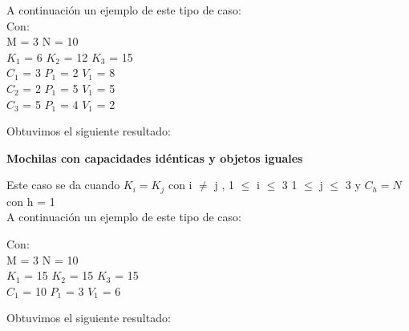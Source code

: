 A continuaci\'on un ejemplo de este tipo de caso:\\

 Con:\\
 M = 3 N = 10\\
 $K_{1}$ = 6  $K_{2}$ = 12  $K_{3}$ = 15 \\
 $C_{1}$ = 3 $P_{1}$ = 2 $V_{1}$ = 8\\
 $C_{2}$ = 2 $P_{1}$ = 5 $V_{1}$ = 5\\
 $C_{3}$ = 5 $P_{1}$ = 4 $V_{1}$ = 2\\
  
  \indent  
  
  Obtuvimos el siguiente resultado:\\


\begin{center}
 \textbf{Mochilas con capacidades id\'enticas y objetos iguales}
\end{center}

Este caso se da cuando $K_{i} = K_{j}$ con i $\neq$ j , 1 $\leq$ i $\leq$ 3  1 $\leq$ j $\leq$ 3  y $C_{h} = N$ con h = 1\\

A continuaci\'on un ejemplo de este tipo de caso:

 Con:\\
 M = 3 N = 10\\
 $K_{1}$ = 15  $K_{2}$ = 15  $K_{3}$ = 15 \\
 $C_{1}$ = 10 $P_{1}$ = 3 $V_{1}$ = 6\\
  
  \indent  
  
  Obtuvimos el siguiente resultado:\\

